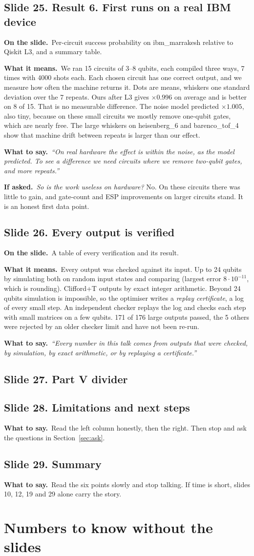 \documentclass[11pt,a4paper]{article}
\newcommand{\say}[1]{\emph{``#1''}}
\newcommand{\slide}[2]{\subsection*{Slide #1. #2}}
\newcommand{\shows}{\par\textbf{\color{ibar}On the slide.}\ }
\newcommand{\means}{\par\textbf{\color{ibar}What it means.}\ }
\newcommand{\tosay}{\par\textbf{\color{ibar}What to say.}\ }
\newcommand{\ifasked}{\par\textbf{\color{ibar}If asked.}\ }
\begin{document}
\slide{25}{Result 6. First runs on a real IBM device}
\shows Per-circuit success probability on ibm\_marrakesh relative to Qiskit L3, and a summary table.
\means We ran 15 circuits of 3--8 qubits, each compiled three ways, 7 times with 4000 shots each. Each chosen circuit has
one correct output, and we measure how often the machine returns it. Dots are means, whiskers one standard deviation over
the 7 repeats. Ours after L3 gives $\times0.996$ on average and is better on 8 of 15. That is no measurable difference.
The noise model predicted $\times1.005$, also tiny, because on these small circuits we mostly remove one-qubit gates,
which are nearly free. The large whiskers on heisenberg\_6 and barenco\_tof\_4 show that machine drift between repeats is
larger than our effect.
\tosay \say{On real hardware the effect is within the noise, as the model predicted. To see a difference we need circuits
where we remove two-qubit gates, and more repeats.}
\ifasked \emph{So is the work useless on hardware?} No. On these circuits there was little to gain, and gate-count and ESP
improvements on larger circuits stand. It is an honest first data point.

\slide{26}{Every output is verified}
\shows A table of every verification and its result.
\means Every output was checked against its input. Up to 24 qubits by simulating both on random input states and comparing
(largest error $8\cdot10^{-11}$, which is rounding). Clifford+T outputs by exact integer arithmetic. Beyond 24 qubits
simulation is impossible, so the optimiser writes a \emph{replay certificate}, a log of every small step. An independent
checker replays the log and checks each step with small matrices on a few qubits. 171 of 176 large outputs passed, the 5
others were rejected by an older checker limit and have not been re-run.
\tosay \say{Every number in this talk comes from outputs that were checked, by simulation, by exact arithmetic, or by
replaying a certificate.}

\slide{27}{Part V divider}

\slide{28}{Limitations and next steps}
\tosay Read the left column honestly, then the right. Then stop and ask the questions in Section~\ref{sec:ask}.

\slide{29}{Summary}
\tosay Read the six points slowly and stop talking. If time is short, slides 10, 12, 19 and 29 alone carry the story.

\section{Numbers to know without the slides}
\end{document}
